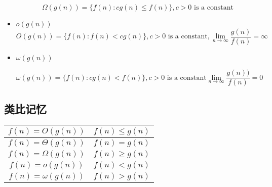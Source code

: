 \documentclass[11pt]{article}
\begin{document}
\begin{CJK}{UTF8}{gbsn}
\begin{itemize}
  \begin{displaymath}
    \Omega(g(n))=\{f(n):cg(n)\leqslant f(n) \},c>0\mbox{ is a constant}
  \end{displaymath}
  
\item $o(g(n))$
  \begin{displaymath}
    O(g(n))=\{f(n): f(n) < c g(n)\},c>0\mbox{ is a constant}, \lim_{n\rightarrow \infty} \frac{g(n)}{f(n)}=\infty
  \end{displaymath}

  \item $\omega(g(n))$

  \begin{displaymath}
    \omega(g(n))=\{f(n):cg(n)< f(n) \},c>0\mbox{ is a constant} \lim_{n\rightarrow \infty} \frac{g(n))}{f(n)}=0
  \end{displaymath}
  
\end{itemize}

\subsection{类比记忆}


\begin{center}
  \begin{tabular}{|c|c|}
    \hline
    $f(n)=O(g(n))$ & $f(n)\leqslant g(n)$  \\\hline
    $f(n)=\Theta(g(n))$ & $f(n) = g(n)$  \\\hline
    $f(n)=\Omega(g(n))$ & $f(n) \geqslant  g(n)$  \\\hline
    $f(n)=o(g(n))$ & $f(n) < g(n) $ \\\hline
    $f(n)=\omega(g(n))$ & $f(n) > g(n)$ \\
    \hline
  \end{tabular}
\end{center}


\end{CJK}
\end{document}

